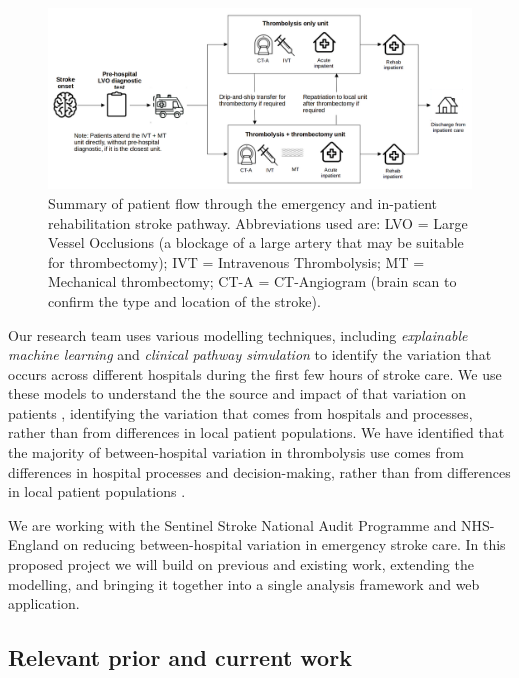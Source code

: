 \begin{figure}[h!]
\centering
\includegraphics[width=1.0\textwidth]{./images/pathway}
\caption{Summary of patient flow through the emergency and in-patient rehabilitation stroke pathway. Abbreviations used are: LVO = Large Vessel Occlusions (a blockage of a large artery that may be suitable for thrombectomy); IVT = Intravenous Thrombolysis; MT = Mechanical thrombectomy; CT-A = CT-Angiogram (brain scan to confirm the type and location of the stroke).}
\label{fig:flow}
\end{figure}

Our research team uses various modelling techniques, including \textit{explainable machine learning} and \textit{clinical pathway simulation} to identify the variation that occurs across different hospitals during the first few hours of stroke care. We use these models to understand the the source and impact of that variation on patients \cite{allen_using_2022, allen_use_2022}, identifying the variation that comes from hospitals and processes, rather than from differences in local patient populations. We have identified that the majority of between-hospital variation in thrombolysis use comes from differences in hospital processes and decision-making, rather than from differences in local patient populations \cite{allen_using_2022, allen_use_2022}.

We are working with the Sentinel Stroke National Audit Programme and NHS-England on reducing between-hospital variation in emergency stroke care. In this proposed project we will build on previous and existing work, extending the modelling, and bringing it together into a single analysis framework and web application. 

\subsection*{Relevant prior and current work}

